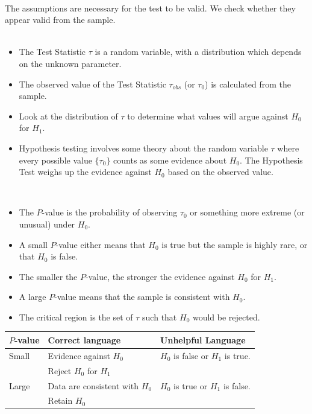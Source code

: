 \documentclass[t,xcolor=pdftex,dvipsnames,table]{beamer}
\begin{document}
\begin{frame}[fragile]{}

 \\
The assumptions are necessary for the test to be valid. We check whether they appear valid from the sample. \\

\vspace{.5cm}
 \\
\begin{itemize}
\item The Test Statistic $\tau$ is a random variable, with a distribution which depends on the unknown parameter.
\item The observed value of the Test Statistic $\tau_{obs}$ (or $\tau_{0}$) is calculated from the sample.
\item Look at the distribution of $\tau$ to determine what values will argue against $H_0$ for $H_1$.
\item Hypothesis testing involves some theory about the random variable $\tau$ where every possible value $\{ \tau_{0} \}$ counts as some evidence about $H_{0}$. The Hypothesis Test weighs up  the evidence against $H_{0}$ based on the observed value.
\end{itemize}
\end{frame}

\begin{frame}[fragile]{}

 \\
\begin{itemize}
\item The $P$-value is the probability of observing $\tau_{0}$ or something more extreme (or unusual) under $H_{0}$. 

\item A small $P$-value either means that $H_{0}$ is true but the sample is highly rare, or that $H_{0}$ is false.

\item  The smaller the $P$-value, the stronger the evidence against $H_{0}$ for $H_{1}$.  

\item A large $P$-value means that the sample is consistent with $H_{0}$.

\item The critical region is the set of $\tau$ such that $H_{0}$ would be rejected.
\end{itemize}

\begin{tabular}{|l|l|l|} \hline
$P$-value & Correct language & Unhelpful Language \\ \hline
Small & Evidence against $H_{0}$ & $H_{0}$ is false or $H_{1}$ is true. \\
& Reject $H_{0}$  for $H_{1}$ & \\ \hline
Large & Data are consistent with $H_{0}$   & $H_{0}$ is true or $H_{1}$ is false. \\
& Retain $H_{0}$ & \\ \hline
\end{tabular}

\end{frame}
\end{document}
